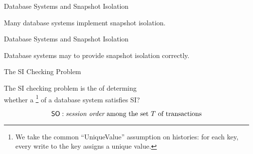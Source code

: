 
\begin{frame}{Database Systems and Snapshot Isolation}
  \begin{center}
    Many database systems implement snapshot isolation.

    \vspace{0.30cm}
  \end{center}
\end{frame}

\begin{frame}{Database Systems and Snapshot Isolation}
  \begin{center}
    Database systems may  to provide snapshot isolation correctly.

    \vspace{0.30cm}
  \end{center}
\end{frame}

\begin{frame}{The SI Checking Problem}
  \begin{definition}
    The SI checking problem is the  of determing \\[5pt]
    whether a \footnote{
      We take the common ``UniqueValue'' assumption on histories:
      for each key, every write to the key assigns a unique value.
    } of a database system satisfies SI?
  \end{definition}


  \vspace{-0.50cm}
  \[
    \textup{\textsf{SO}}: \text{{\it session order} among the set $T$ of transactions}
  \]
\end{frame}

